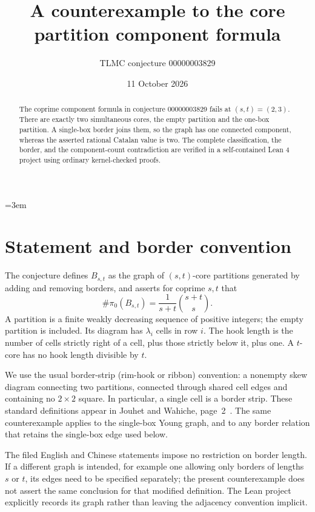 \documentclass[10pt]{article}
\title{A counterexample to the core partition component formula}
\author{TLMC conjecture 00000003829}
\date{11 October 2026}
\begin{document}
\emergencystretch=3em
\maketitle
\begin{abstract}
The coprime component formula in conjecture 00000003829 fails at
$(s,t)=(2,3)$. There are exactly two simultaneous cores, the empty
partition and the one-box partition. A single-box border joins them,
so the graph has one connected component, whereas the asserted rational
Catalan value is two. The complete classification, the border, and the
component-count contradiction are verified in a self-contained Lean 4
project using ordinary kernel-checked proofs.
\end{abstract}

\section{Statement and border convention}
The conjecture defines $B_{s,t}$ as the graph of $(s,t)$-core partitions
generated by adding and removing borders, and asserts for coprime $s,t$
that
\[
\#\pi_0(B_{s,t})=\frac{1}{s+t}\binom{s+t}{s}.
\]
A partition is a finite weakly decreasing sequence of positive integers;
the empty partition is included. Its diagram has $\lambda_i$ cells in
row $i$. The hook length is the number of cells strictly right of a
cell, plus those strictly below it, plus one. A $t$-core has no hook
length divisible by $t$.

We use the usual border-strip (rim-hook or ribbon) convention: a
nonempty skew diagram connecting two partitions, connected through
shared cell edges and containing no $2\times2$ square. In particular,
a single cell is a border strip. These standard definitions appear in
Jouhet and Wahiche, page~2~\cite{jw}. The same counterexample applies to
the single-box Young graph, and to any border relation that retains the
single-box edge used below.

The filed English and Chinese statements impose no restriction on border
length. If a different graph is intended, for example one allowing only
borders of lengths $s$ or $t$, its edges need to be specified separately;
the present counterexample does not assert the same conclusion for that
modified definition. The Lean project explicitly records its graph
rather than leaving the adjacency convention implicit.
\end{document}
